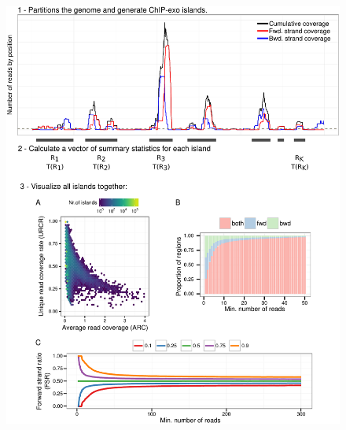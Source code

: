 \documentclass{bmcart}\usepackage[]{graphicx}\usepackage[]{color}
\begin{document}

\newpage

\begin{figure}[h!]
  \centering
  \includegraphics[width = \textwidth]{../figs/for_paper/coverage_diagram3.pdf}

\end{figure}
\end{document}
